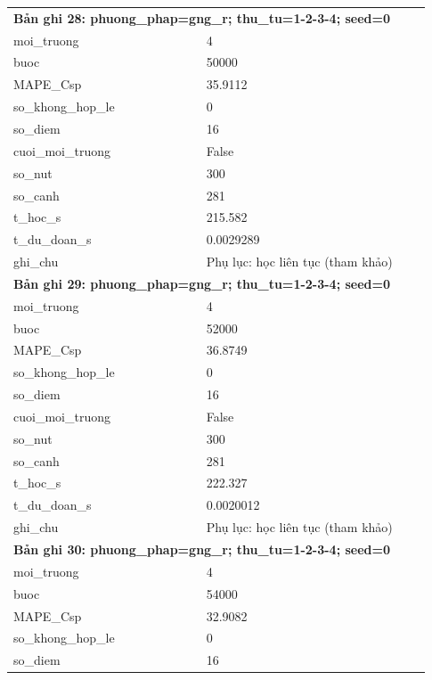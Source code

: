 \begin{longtable}{p{0.43\linewidth}p{0.50\linewidth}}
\midrule
\multicolumn{2}{p{0.95\linewidth}}{\textbf{Bản ghi 28: phuong\_phap=gng\_r; thu\_tu=1-2-3-4; seed=0}} \\
moi\_\allowbreak truong & 4 \\
buoc & 50000 \\
MAPE\_\allowbreak Csp & 35.9112 \\
so\_\allowbreak khong\_\allowbreak hop\_\allowbreak le & 0 \\
so\_\allowbreak diem & 16 \\
cuoi\_\allowbreak moi\_\allowbreak truong & False \\
so\_\allowbreak nut & 300 \\
so\_\allowbreak canh & 281 \\
t\_\allowbreak hoc\_\allowbreak s & 215.582 \\
t\_\allowbreak du\_\allowbreak doan\_\allowbreak s & 0.0029289 \\
ghi\_\allowbreak chu & Phụ lục: học liên tục (tham khảo) \\
\midrule
\multicolumn{2}{p{0.95\linewidth}}{\textbf{Bản ghi 29: phuong\_phap=gng\_r; thu\_tu=1-2-3-4; seed=0}} \\
moi\_\allowbreak truong & 4 \\
buoc & 52000 \\
MAPE\_\allowbreak Csp & 36.8749 \\
so\_\allowbreak khong\_\allowbreak hop\_\allowbreak le & 0 \\
so\_\allowbreak diem & 16 \\
cuoi\_\allowbreak moi\_\allowbreak truong & False \\
so\_\allowbreak nut & 300 \\
so\_\allowbreak canh & 281 \\
t\_\allowbreak hoc\_\allowbreak s & 222.327 \\
t\_\allowbreak du\_\allowbreak doan\_\allowbreak s & 0.0020012 \\
ghi\_\allowbreak chu & Phụ lục: học liên tục (tham khảo) \\
\midrule
\multicolumn{2}{p{0.95\linewidth}}{\textbf{Bản ghi 30: phuong\_phap=gng\_r; thu\_tu=1-2-3-4; seed=0}} \\
moi\_\allowbreak truong & 4 \\
buoc & 54000 \\
MAPE\_\allowbreak Csp & 32.9082 \\
so\_\allowbreak khong\_\allowbreak hop\_\allowbreak le & 0 \\
so\_\allowbreak diem & 16 \\

\end{longtable}
